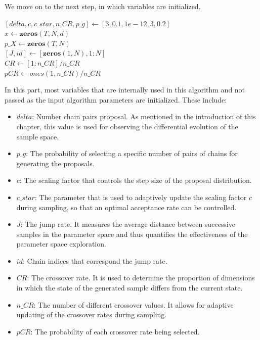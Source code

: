 We move on to the next step, in which variables are initialized.\\

\begin{algorithm}[H]
$[delta, c, c\_star, n\_CR, p\_g] \gets [3, 0.1, 1e-12, 3, 0.2]$\\
$x \gets \textbf{zeros}(T, N, d)$\\
$p\_X \gets \textbf{zeros}(T, N)$\\
$[J, id] \gets [\textbf{zeros}(1, N), 1:N]$\\
$CR \gets [1:n\_CR] / n\_CR$\\
$pCR \gets ones(1, n\_CR) / n\_CR$\\
\end{algorithm}

In this part, most variables that are internally used in this algorithm and not passed as the input algorithm parameters are initialized. These include:
\begin{itemize}
    \item $delta$: Number chain pairs proposal. As mentioned in the introduction of this chapter, this value is used for observing the differential evolution of the sample space.
    \item $p\_g$: The probability of selecting a specific number of pairs of chains for generating the proposals.
    \item $c$: The scaling factor that controls the step size of the proposal distribution.
    \item $c\_star$: The parameter that is used to adaptively update the scaling factor $c$ during sampling, so that an optimal acceptance rate can be controlled.
    \item $J$: The jump rate. It measures the average distance between successive samples in the parameter space and thus quantifies the effectiveness of the parameter space exploration.
    \item $id$: Chain indices that correspond the jump rate.
    \item $CR$: The crossover rate. It is used to determine the proportion of dimensions in which the state of the generated sample differs from the current state.
    \item $n\_CR$: The number of different crossover values. It allows for adaptive updating of the crossover rates during sampling.
    \item $pCR$: The probability of each crossover rate being selected.
\end{itemize}

